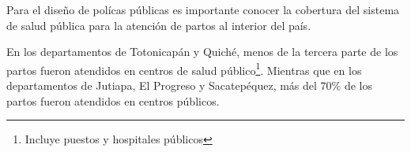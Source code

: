 Para el diseño de polícas públicas es importante  conocer la cobertura del sistema de salud pública para la atención de partos al interior del país.  

En los departamentos de Totonicapán y Quiché, menos de la tercera parte de los partos fueron atendidos en centros de salud público\footnote{Incluye puestos y hospitales públicos}. Mientras que en los departamentos de Jutiapa, El Progreso y Sacatepéquez, más del 70\% de los partos fueron atendidos en centros públicos.  